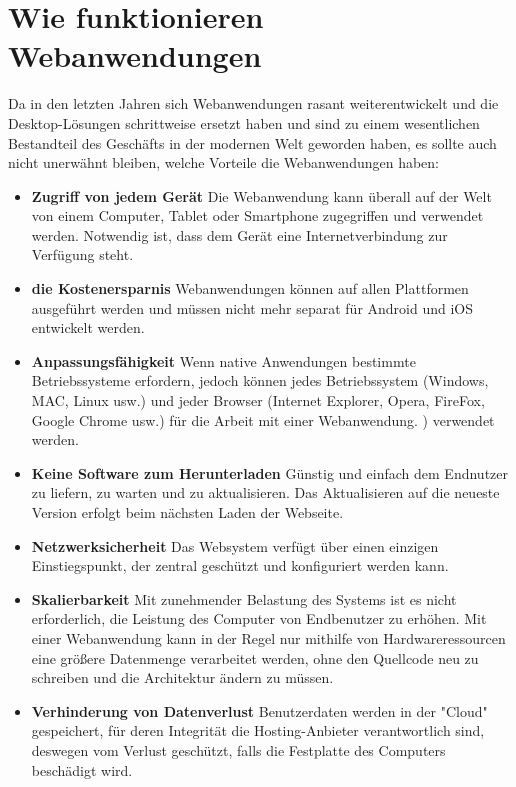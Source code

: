\section{Wie funktionieren Webanwendungen}
\label{sec:theorie:webapp}
Da in den letzten Jahren sich Webanwendungen rasant weiterentwickelt und die Desktop-Lösungen schrittweise ersetzt haben und sind zu einem wesentlichen Bestandteil des Geschäfts in der modernen Welt geworden haben, es sollte auch nicht unerwähnt bleiben, welche Vorteile die Webanwendungen haben:

\begin{itemize}
	\item \textbf{Zugriff von jedem Gerät} Die Webanwendung kann überall auf der Welt von einem Computer, Tablet oder Smartphone zugegriffen und verwendet werden. Notwendig ist, dass dem Gerät eine Internetverbindung zur Verfügung steht.

\item \textbf{die Kostenersparnis} Webanwendungen können auf allen Plattformen ausgeführt werden und müssen nicht mehr separat für Android und iOS entwickelt werden.

\item \textbf{Anpassungsfähigkeit} Wenn native Anwendungen bestimmte Betriebssysteme erfordern, jedoch können jedes Betriebssystem (Windows, MAC, Linux usw.) und jeder Browser (Internet Explorer, Opera, FireFox, Google Chrome usw.) für die Arbeit mit einer Webanwendung. ) verwendet werden.

\item \textbf{Keine Software zum Herunterladen} Günstig und einfach dem Endnutzer zu liefern, zu warten und zu aktualisieren. Das Aktualisieren auf die neueste Version erfolgt beim nächsten Laden der Webseite.

\item \textbf{Netzwerksicherheit} Das Websystem verfügt über einen einzigen Einstiegspunkt, der zentral geschützt und konfiguriert werden kann.

\item \textbf{Skalierbarkeit} Mit zunehmender Belastung des Systems ist es nicht erforderlich, die Leistung des Computer von Endbenutzer zu erhöhen. Mit einer Webanwendung kann in der Regel nur mithilfe von Hardwareressourcen eine größere Datenmenge verarbeitet werden, ohne den Quellcode neu zu schreiben und die Architektur ändern zu müssen.

\item \textbf{Verhinderung von Datenverlust} Benutzerdaten werden in der "Cloud" gespeichert, für deren Integrität die Hosting-Anbieter verantwortlich sind, deswegen vom Verlust geschützt, falls die Festplatte des Computers beschädigt wird.
\end{itemize}

